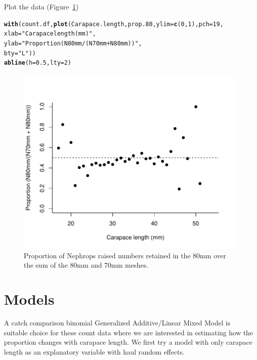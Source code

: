 \documentclass[12pt]{article}\usepackage[]{graphicx}\usepackage[]{color}
\makeatletter
\def\maxwidth{ %
  \ifdim\Gin@nat@width>\linewidth
    \linewidth
  \else
    \Gin@nat@width
  \fi
}
\newcommand{\hlnum}[1]{\textcolor[rgb]{0.686,0.059,0.569}{#1}}%
\newcommand{\hlstr}[1]{\textcolor[rgb]{0.192,0.494,0.8}{#1}}%
\newcommand{\hlstd}[1]{\textcolor[rgb]{0.345,0.345,0.345}{#1}}%
\newcommand{\hlkwc}[1]{\textcolor[rgb]{0.333,0.667,0.333}{#1}}%
\newcommand{\hlkwd}[1]{\textcolor[rgb]{0.737,0.353,0.396}{\textbf{#1}}}%
\newenvironment{kframe}{%
 \def\at@end@of@kframe{}%
 \ifinner\ifhmode%
  \def\at@end@of@kframe{\end{minipage}}%
  \begin{minipage}{\columnwidth}%
 \fi\fi%
 \def\FrameCommand##1{\hskip\@totalleftmargin \hskip-\fboxsep
 \colorbox{shadecolor}{##1}\hskip-\fboxsep
     \hskip-\linewidth \hskip-\@totalleftmargin \hskip\columnwidth}%
 \MakeFramed {\advance\hsize-\width
   \@totalleftmargin\z@ \linewidth\hsize
   \@setminipage}}%
 {\par\unskip\endMakeFramed%
 \at@end@of@kframe}
\newenvironment{knitrout}{}{} %
\makeatother
\begin{document}
Plot the data (Figure~\ref{fig:rawprops})
\begin{knitrout}\footnotesize
{}\color{fgcolor}\begin{kframe}
\begin{alltt}
\hlkwd{with}\hlstd{(count.df,} \hlkwd{plot}\hlstd{(Carapace.length, prop.80,} \hlkwc{ylim} \hlstd{=} \hlkwd{c}\hlstd{(}\hlnum{0}\hlstd{,} \hlnum{1}\hlstd{),} \hlkwc{pch} \hlstd{=} \hlnum{19}\hlstd{,}
                    \hlkwc{xlab} \hlstd{=} \hlstr{"Carapace length (mm)"}\hlstd{,}
                    \hlkwc{ylab} \hlstd{=} \hlstr{"Proportion (N80mm/(N70mm + N80mm))"}\hlstd{,}
                    \hlkwc{bty} \hlstd{=} \hlstr{"L"}\hlstd{))}
\hlkwd{abline}\hlstd{(}\hlkwc{h} \hlstd{=} \hlnum{0.5}\hlstd{,} \hlkwc{lty} \hlstd{=} \hlnum{2}\hlstd{)}
\end{alltt}
\end{kframe}\begin{figure}
\includegraphics[width=\maxwidth]{figure/rawprops-1} \caption[Proportion of Nephrops raised numbers retained in the 80mm over the sum of the 80mm and 70mm meshes]{Proportion of Nephrops raised numbers retained in the 80mm over the sum of the 80mm and 70mm meshes.}\label{fig:rawprops}
\end{figure}


\end{knitrout}

\section{Models}
A catch comparison binomial Generalized Additive/Linear Mixed Model is suitable choice for these count data where we are interested in estimating how the proportion changes with carapace length. We first try a model with only carapace length as an explanatory variable with haul random effects.
\end{document}
